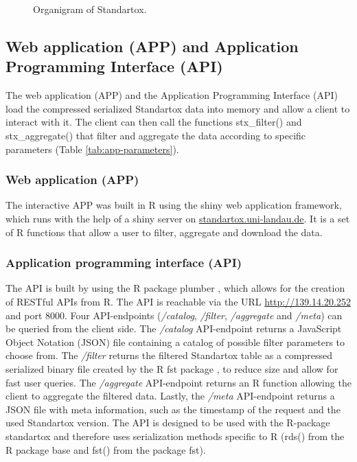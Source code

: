 \begin{figure}
    
    \caption{Organigram of Standartox.}
    \label{fig:stx-organigram}
\end{figure}

\subsection*{Web application (APP) and Application Programming Interface (API)}
The web application (APP) and the Application Programming Interface (API) load the compressed serialized Standartox data into memory and allow a client to interact with it. The client can then call the functions stx\_filter() and stx\_aggregate() that filter and aggregate the data according to specific parameters (Table \ref{tab:app-parameters}).

\subsubsection*{Web application (APP)}
The interactive APP was built in R using the shiny web application framework, which runs with the help of a shiny server \citep{chang_shiny_2018} on \url{standartox.uni-landau.de}. It is a set of R functions that allow a user to filter, aggregate and download the data.

\subsubsection*{Application programming interface (API)}
The API is built by using the R package plumber \citep{trestletechnologyllc_plumber_2018}, which allows for the creation of RESTful APIs from R. The API is reachable via the URL \url{http://139.14.20.252} and port 8000. Four API-endpoints (\textit{/catalog}, \textit{/filter}, \textit{/aggregate} and \textit{/meta}) can be queried from the client side. The \textit{/catalog} API-endpoint returns a JavaScript Object Notation (JSON) file containing a catalog of possible filter parameters to choose from. The \textit{/filter} returns the filtered Standartox table as a compressed serialized binary file created by the R fst package \citep{klik_fst_2019}, to reduce size and allow for fast user queries. The \textit{/aggregate} API-endpoint returns an R function allowing the client to aggregate the filtered data. Lastly, the \textit{/meta} API-endpoint returns a JSON file with meta information, such as the timestamp of the request and the used Standartox version. The API is designed to be used with the R-package standartox and therefore uses serialization methods specific to R (rds() from the R package base and fst() from the package fst).

